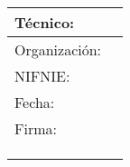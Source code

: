 \documentclass[conference,12pt]{IEEEtran}
\author{\TextField[name=Proyecto,width=16cm]{}}
\date{\today}
\let\OldTextField\TextField
\renewcommand{\TextField}[2][]{%
  \raisebox{-0.3ex}{\OldTextField[height=.85em,  bordercolor={1 1 1}, backgroundcolor={1 1 1},#1]{#2}}%
}
\begin{document}

\justifying
\begin{Form}
\maketitle
\vspace{10cm}
\begin{table}[h!]
    \centering
    \begin{tabular}{|p{2cm}|p{8cm}|}
        \hline
        Técnico: &     \TextField[name=Tecnico,width=6cm]{} 
        \\
        \hline
        Organización: &     \TextField[name=Organizacion,width=6cm]{} 
        \\
        \hline
        NIF\/NIE: &    \TextField[name = NIF,width=6cm]{} 
        \\ 
        \hline
        Fecha: &    \TextField[name = Fecha,width=6cm]{} 
        \\ 
        \hline
        Firma: &     
        \\ &
        \\ &
        \\ &
        \\ \hline
    \end{tabular}
\end{table}
\newpage
\begin{abstract}
    \resumen
\end{abstract}
\tableofcontents
\newpage
































\end{Form}
\end{document}
